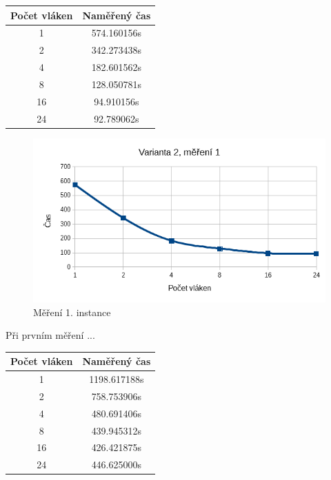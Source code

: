 \documentclass[12pt]{article}
\begin{document}
\begin{center}
\begin{tabular}{ c | c }
\textbf{Počet vláken} & \textbf{Naměřený čas} \\ \hline \hline 
1 & 574.160156s \\ \hline
2 & 342.273438s \\ \hline
4 & 182.601562s \\ \hline
8 & 128.050781s \\ \hline
16 & 94.910156s \\ \hline
24 & 92.789062s \\ \hline
\end{tabular}
\end{center}

\begin{figure}[h]
  \begin{center}
     \includegraphics[width=12cm]{images/sse1.png}
    \caption{Měření 1. instance} 
  \end{center}
\end{figure}

Při prvním měření ...



\begin{center}
\begin{tabular}{ c | c }
\textbf{Počet vláken} & \textbf{Naměřený čas} \\ \hline \hline 
1 & 1198.617188s \\ \hline
2 & 758.753906s \\ \hline
4 & 480.691406s \\ \hline
8 & 439.945312s \\ \hline
16 & 426.421875s \\ \hline
24 & 446.625000s \\ \hline
\end{tabular}
\end{center}
\end{document}
